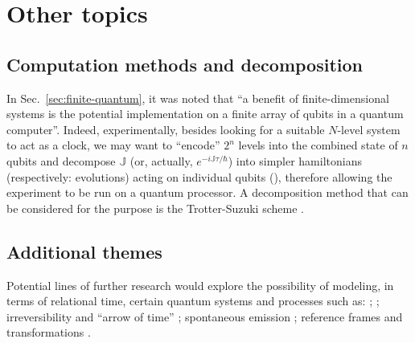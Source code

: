 \section{Other topics}\label{sec:outlook-misc}

\subsection{Computation methods and decomposition}

In Sec.~\ref{sec:finite-quantum}, it was noted that
``a benefit of finite-dimensional systems is the potential implementation on a finite array of
qubits in a quantum computer''.
Indeed,
experimentally,
besides looking for a suitable $N$-level system to act as a clock,
we may want to ``encode'' $2^{n}$ levels into the combined state of $n$
qubits and
decompose $\mathbb{J}$ (or, actually, $e^{-i\mathbb{J}\tau/\hbar}$)
into simpler hamiltonians (respectively: evolutions)
acting on individual qubits (),
therefore allowing the experiment to be run on a quantum processor.
A decomposition method that can be considered for the purpose
is the Trotter-Suzuki scheme
\parencite{Trotter-Suzuki:exp, Trotter-Suzuki:GPU}.

\subsection{Additional themes}

Potential lines of further research would explore the possibility of modeling,
in terms of relational time,
certain quantum systems and processes such as:
%
 \parencite{crystal2,crystal3,crystal2012};
%
 \parencite{TQM1, TQM2};
%
irreversibility and ``arrow of time'' \parencite{Josset_Thermo};
%
spontaneous emission \parencite{Souza_Spontaneous};
%
reference frames and transformations \parencite{Adlam_ReferenceFrames}.
